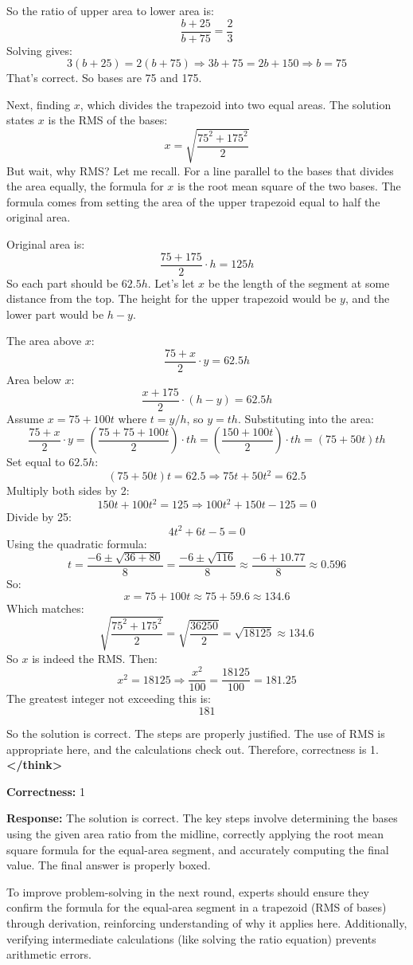 \begin{tcolorbox}[
  title=Multiagent Collaborative Reasoning Trace Data Sample,
  breakable,
  colback=white,
  colframe=black
]
So the ratio of upper area to lower area is:
\[
\frac{b + 25}{b + 75} = \frac{2}{3}
\]
Solving gives:
\[
3(b + 25) = 2(b + 75) \Rightarrow 3b + 75 = 2b + 150 \Rightarrow b = 75
\]
That's correct. So bases are 75 and 175.

Next, finding \( x \), which divides the trapezoid into two equal areas. The solution states \( x \) is the RMS of the bases:
\[
x = \sqrt{\frac{75^2 + 175^2}{2}}
\]
But wait, why RMS? Let me recall. For a line parallel to the bases that divides the area equally, the formula for \( x \) is the root mean square of the two bases. The formula comes from setting the area of the upper trapezoid equal to half the original area.

Original area is:
\[
\frac{75 + 175}{2} \cdot h = 125h
\]
So each part should be \( 62.5h \). Let’s let \( x \) be the length of the segment at some distance from the top. The height for the upper trapezoid would be \( y \), and the lower part would be \( h - y \).

The area above \( x \): 
\[
\frac{75 + x}{2} \cdot y = 62.5h
\]
Area below \( x \):
\[
\frac{x + 175}{2} \cdot (h - y) = 62.5h
\]
Assume \( x = 75 + 100t \) where \( t = y/h \), so \( y = th \). Substituting into the area:
\[
\frac{75 + x}{2} \cdot y = \left(\frac{75 + 75 + 100t}{2}\right) \cdot th = \left(\frac{150 + 100t}{2}\right) \cdot th = (75 + 50t)th
\]
Set equal to \( 62.5h \):
\[
(75 + 50t)t = 62.5 \Rightarrow 75t + 50t^2 = 62.5
\]
Multiply both sides by 2:
\[
150t + 100t^2 = 125 \Rightarrow 100t^2 + 150t - 125 = 0
\]
Divide by 25:
\[
4t^2 + 6t - 5 = 0
\]
Using the quadratic formula:
\[
t = \frac{-6 \pm \sqrt{36 + 80}}{8} = \frac{-6 \pm \sqrt{116}}{8} \approx \frac{-6 + 10.77}{8} \approx 0.596
\]
So:
\[
x = 75 + 100t \approx 75 + 59.6 \approx 134.6
\]
Which matches:
\[
\sqrt{\frac{75^2 + 175^2}{2}} = \sqrt{\frac{36250}{2}} = \sqrt{18125} \approx 134.6
\]
So \( x \) is indeed the RMS. Then:
\[
x^2 = 18125 \Rightarrow \frac{x^2}{100} = \frac{18125}{100} = 181.25
\]
The greatest integer not exceeding this is:
\[
\boxed{181}
\]

So the solution is correct. The steps are properly justified. The use of RMS is appropriate here, and the calculations check out. Therefore, correctness is 1.
\textbf{\textless /think\textgreater} 

\textbf{Correctness:} 1

\textbf{Response:} The solution is correct. The key steps involve determining the bases using the given area ratio from the midline, correctly applying the root mean square formula for the equal-area segment, and accurately computing the final value. The final answer is properly boxed.

To improve problem-solving in the next round, experts should ensure they confirm the formula for the equal-area segment in a trapezoid (RMS of bases) through derivation, reinforcing understanding of why it applies here. Additionally, verifying intermediate calculations (like solving the ratio equation) prevents arithmetic errors.
\end{tcolorbox}
